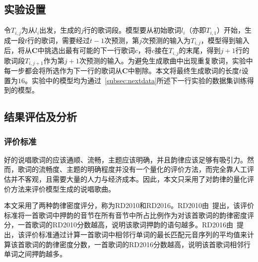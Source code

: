 \subsection{实验设置}
令$T_{i,j}$为从$l_i$出发，生成的$j$行的歌词段。模型要从初始歌词$l_i$（亦即$T_{i, 1}$）开始，生成一段$t$行的歌词，需要经过$t-1$次预测，第$j$次预测的输入为$T_{i, j}$，模型得到输入后，将从$\bm C{}$中挑选出最有可能的下一行歌词$c$，将$c$接在$T_{i, j}$的末尾，得到$j+1$行的歌词段$T_{i, j+1}$作为第$j+1$次预测的输入。为避免生成歌曲中出现重复歌词，实验中每一步都会将所选作为下一行的歌词从$\bm C$中剔除。本文将最终生成歌词的长度$t$设置为$16$。实验中的模型均为通过~\ref{subsec:nextdata}所述下一行实验的数据集训练得到的模型。\par

\subsection{结果评估及分析}
\subsubsection{评价标准}
好的说唱歌词的应该通顺、流畅，主题应该明确，并且韵律应该足够有吸引力。然而，歌词的流畅度、主题的明确程度并没有一个量化的评价方法，而完全靠人工评估并不客观，且需要大量的人力与经济成本。因此，本文只采用了对韵律的量化评价方法来评价模型生成的说唱歌曲。\par

本文采用了两种韵律密度评分，称为RD2010和RD2016。RD2010由~\cite{hirjee2010using}提出，该评价标准将一首歌词中押韵的音节在所有音节中所占比例作为对该首歌词的韵律密度评分，一首歌词的RD2010分数越高，说明该歌词押韵的语句越多。RD2016由~\cite{Malmi2016dopelearning}提出，该评价标准通过计算一首歌词中相邻行单词的最长匹配元音序列的平均值来计算该首歌词的韵律密度分数，一首歌词的RD2016分数越高，说明该首歌词相邻行单词之间押韵越多。\par

